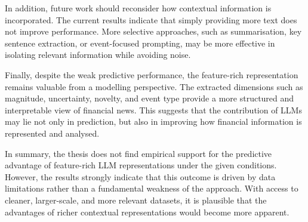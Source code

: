In addition, future work should reconsider how contextual information is incorporated. The current results indicate that simply providing more text does not improve performance. More selective approaches, such as summarisation, key sentence extraction, or event-focused prompting, may be more effective in isolating relevant information while avoiding noise.

Finally, despite the weak predictive performance, the feature-rich representation remains valuable from a modelling perspective. The extracted dimensions such as magnitude, uncertainty, novelty, and event type provide a more structured and interpretable view of financial news. This suggests that the contribution of LLMs may lie not only in prediction, but also in improving how financial information is represented and analysed.

In summary, the thesis does not find empirical support for the predictive advantage of feature-rich LLM representations under the given conditions. However, the results strongly indicate that this outcome is driven by data limitations rather than a fundamental weakness of the approach. With access to cleaner, larger-scale, and more relevant datasets, it is plausible that the advantages of richer contextual representations would become more apparent.